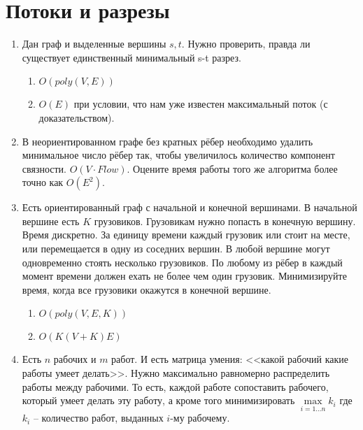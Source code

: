 \section*{Потоки и разрезы}
\begin{enumerate}
	\item Дан граф и выделенные вершины $s, t$. Нужно проверить, правда ли существует единственный минимальный s-t разрез.
	\begin{enumerate}
		\item $O(poly(V, E))$
		\item $O(E)$ при условии, что нам уже известен максимальный поток (с доказательством).
	\end{enumerate}
	
	\item В неориентированном графе без кратных рёбер необходимо удалить минимальное число рёбер так, чтобы увеличилось количество компонент связности. $O(V \cdot Flow)$. Оцените время работы	того же алгоритма более точно как $O(E^2)$.
	
	\item Есть ориентированный граф с начальной и конечной вершинами. В начальной вершине есть $K$ грузовиков. Грузовикам нужно попасть в конечную вершину. Время дискретно. За единицу времени каждый грузовик или стоит на месте, или перемещается в одну из соседних вершин. В любой вершине могут одновременно стоять несколько грузовиков. По любому из рёбер в каждый момент времени должен ехать не более чем один грузовик. Минимизируйте время, когда все грузовики окажутся в конечной вершине.
	\begin{enumerate}
		\item $O(poly(V, E, K))$
		\item $O(K(V + K)E)$
	\end{enumerate}
	
	\item Есть $n$ рабочих и $m$ работ. И есть матрица умения: <<какой рабочий какие работы умеет делать>>. Нужно максимально равномерно распределить работы между рабочими. То есть, каждой работе сопоставить рабочего, который умеет делать эту работу, а кроме того минимизировать $\max\limits_{i=1\dots n} k_i$ где $k_i$ – количество работ, выданных $i$-му рабочему.
\end{enumerate}



